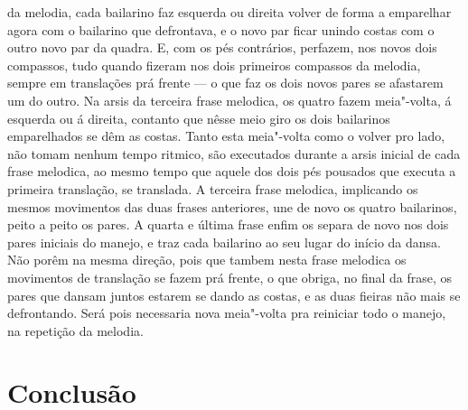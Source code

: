 da melodia, cada bailarino faz esquerda ou direita volver de forma a
emparelhar agora com o bailarino que defrontava, e o novo par ficar
unindo costas com o outro novo par da quadra. E, com os pés contrários,
perfazem, nos novos dois compassos, tudo quando fizeram nos dois
primeiros compassos da melodia, sempre em translações prá frente --- o
que faz os dois novos pares se afastarem um do outro. Na arsis da
terceira frase melodica, os quatro fazem meia"-volta, á esquerda ou á
direita, contanto que nêsse meio giro os dois bailarinos emparelhados se
dêm as costas. Tanto esta meia"-volta como o volver pro lado, não tomam
nenhum tempo ritmico, são executados durante a arsis inicial de cada
frase melodica, ao mesmo tempo que aquele dos dois pés pousados que
executa a primeira translação, se translada. A terceira frase melodica,
implicando os mesmos movimentos das duas frases anteriores, une de novo
os quatro bailarinos, peito a peito os pares. A quarta e última frase
enfim os separa de novo nos dois pares iniciais do manejo, e traz cada
bailarino ao seu lugar do início da dansa. Não porêm na mesma direção,
pois que tambem nesta frase melodica os movimentos de translação se
fazem prá frente, o que obriga, no final da frase, os pares que dansam
juntos estarem se dando as costas, e as duas fieiras não mais se
defrontando. Será pois necessaria nova meia"-volta pra reiniciar todo o
manejo, na repetição da melodia.


\section{Conclusão}

